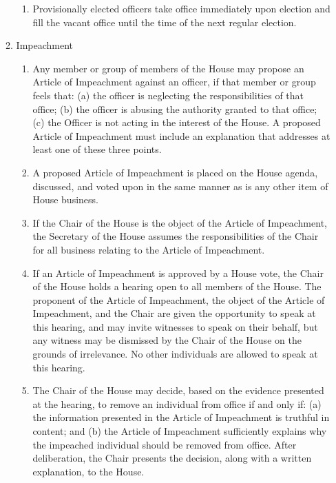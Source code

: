 \documentclass[letterpaper]{article}
\begin{document}
\begin{enumerate}
\begin{enumerate}
\begin{enumerate}
\item Provisionally elected officers take office immediately upon election and fill the vacant office until the time of the next regular election.

\end{enumerate}

\item Impeachment 

\begin{enumerate}

\item Any member or group of members of the House may propose an Article of Impeachment against an officer, if that member or group feels that: (a) the officer is neglecting the responsibilities of that office; (b) the officer is abusing the authority granted to that office; (c) the Officer is not acting in the interest of the House. A proposed Article of Impeachment must include an explanation that addresses at least one of these three points.

\item A proposed Article of Impeachment is placed on the House agenda, discussed, and voted upon in the same manner as is any other item of House business.

\item If the Chair of the House is the object of the Article of Impeachment, the Secretary of the House assumes the responsibilities of the Chair for all business relating to the Article of Impeachment.

\item If an Article of Impeachment is approved by a House vote, the Chair of the House holds a hearing open to all members of the House. The proponent of the Article of Impeachment, the object of the Article of Impeachment, and the Chair are given the opportunity to speak at this hearing, and may invite witnesses to speak on their behalf, but any witness may be dismissed by the Chair of the House on the grounds of irrelevance. No other individuals are allowed to speak at this hearing.

\item The Chair of the House may decide, based on the evidence presented at the hearing, to remove an individual from office if and only if: (a) the information presented in the Article of Impeachment is truthful in content; and (b) the Article of Impeachment sufficiently explains why the impeached individual should be removed from office. After deliberation, the Chair presents the decision, along with a written explanation, to the House.


\end{enumerate}
\end{enumerate}
\end{enumerate}
\end{document}
